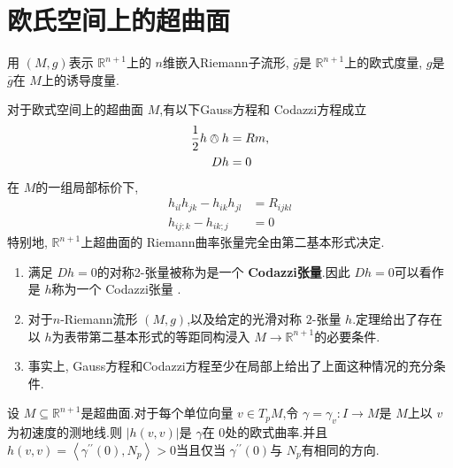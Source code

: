 \documentclass[../../几何与拓扑.tex]{subfiles}
\begin{document}
\section{欧氏空间上的超曲面}

用 \(  \left( M,g \right)   \)表示 \(  \mathbb{R} ^{n+ 1}  \)上的 \(  n  \)维嵌入Riemann子流形, \(  \bar{g}  \)是 \(  \mathbb{R} ^{n+ 1}  \)上的欧式度量, \(  g  \)是 \(  \bar{g}  \)在 \(  M  \)上的诱导度量.        

\begin{proposition}
    对于欧式空间上的超曲面 \(  M  \),有以下Gauss方程和 Codazzi方程成立  \[
    \begin{aligned}
    \frac{1}{2}h \owedge h&= Rm,\\ 
      Dh&= 0
    \end{aligned}
    \]在 \(  M  \)的一组局部标价下, \[
    \begin{aligned}
    h_{il}h_{jk}-h_{ik}h_{jl}&= R_{ijkl}\\ 
    h_{ij;k}-h_{ik;j}&= 0
    \end{aligned}
    \]  特别地,  \(  \mathbb{R} ^{n+ 1}  \)上超曲面的 Riemann曲率张量完全由第二基本形式决定.
\end{proposition}

\begin{remark}
    \begin{enumerate}
        \item 满足 \(  Dh= 0  \)的对称2-张量被称为是一个 \textbf{Codazzi张量}.因此 \(  Dh= 0  \)可以看作是 \(  h  \)称为一个 Codazzi张量   .
        \item 对于\(  n  \)-Riemann流形 \(  \left( M,g \right)   \),以及给定的光滑对称 \(  2  \)-张量 \(  h  \).定理给出了存在以 \(  h  \)为表带第二基本形式的等距同构浸入 \(  M\to \mathbb{R} ^{n+ 1}  \)的必要条件.
        \item 事实上, Gauss方程和Codazzi方程至少在局部上给出了上面这种情况的充分条件.      
    \end{enumerate}
    
\end{remark}

\begin{proposition}
    设 \(  M\subseteq \mathbb{R} ^{n+ 1}  \)是超曲面.对于每个单位向量 \(  v \in T_{p}M  \),令 \(   \gamma =  \gamma _{v}:I\to M  \)是 \(  M  \)上以 \(  v  \)为初速度的测地线.则 \(  \left| h\left( v,v \right)  \right|   \)是 \(   \gamma   \)在 \(  0  \)处的欧式曲率.并且 \(  h\left( v,v \right)= \left< \gamma ^{\prime \prime} \left( 0 \right),N_{p}  \right>> 0   \)当且仅当 \(   \gamma ^{\prime \prime} \left( 0 \right)   \)与 \(  N_{p}  \)有相同的方向.          
\end{proposition}
\end{document}
